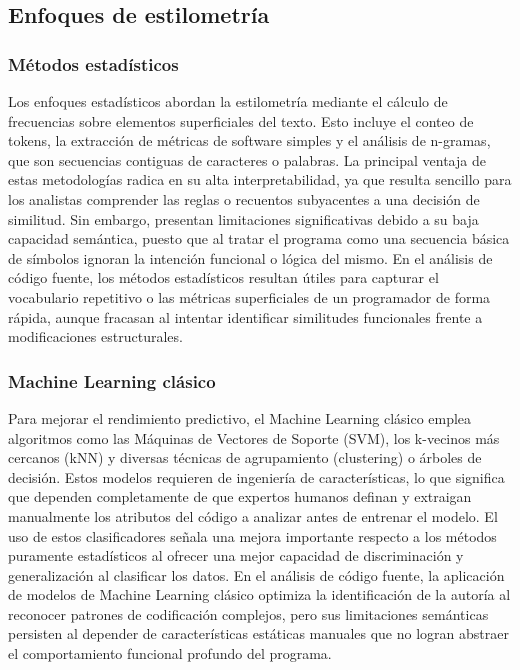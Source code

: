 \subsection{Enfoques de estilometría}

\subsubsection{Métodos estadísticos}

Los enfoques estadísticos abordan la estilometría mediante el cálculo de frecuencias sobre elementos superficiales del texto. Esto incluye el conteo de tokens, la extracción de métricas de software simples y el análisis de n-gramas, que son secuencias contiguas de caracteres o palabras. La principal ventaja de estas metodologías radica en su alta interpretabilidad, ya que resulta sencillo para los analistas comprender las reglas o recuentos subyacentes a una decisión de similitud. Sin embargo, presentan limitaciones significativas debido a su baja capacidad semántica, puesto que al tratar el programa como una secuencia básica de símbolos ignoran la intención funcional o lógica del mismo. En el análisis de código fuente, los métodos estadísticos resultan útiles para capturar el vocabulario repetitivo o las métricas superficiales de un programador de forma rápida, aunque fracasan al intentar identificar similitudes funcionales frente a modificaciones estructurales.

\subsubsection{Machine Learning clásico}

Para mejorar el rendimiento predictivo, el Machine Learning clásico emplea algoritmos como las Máquinas de Vectores de Soporte (SVM), los k-vecinos más cercanos (kNN) y diversas técnicas de agrupamiento (clustering) o árboles de decisión. Estos modelos requieren de ingeniería de características, lo que significa que dependen completamente de que expertos humanos definan y extraigan manualmente los atributos del código a analizar antes de entrenar el modelo. El uso de estos clasificadores señala una mejora importante respecto a los métodos puramente estadísticos al ofrecer una mejor capacidad de discriminación y generalización al clasificar los datos. En el análisis de código fuente, la aplicación de modelos de Machine Learning clásico optimiza la identificación de la autoría al reconocer patrones de codificación complejos, pero sus limitaciones semánticas persisten al depender de características estáticas manuales que no logran abstraer el comportamiento funcional profundo del programa.

